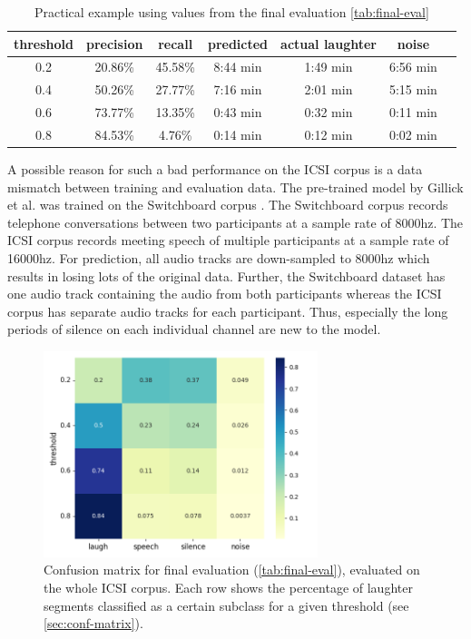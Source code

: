 \documentclass[bsc,frontabs,parskip,deptreport]{infthesis}
\newcommand{\confmatrixcaption}{Each row shows the percentage of laughter segments classified as a certain subclass for a given threshold (see \autoref{sec:conf-matrix}). }
\begin{document}
\begin{table}[]
    \centering
    \begin{tabular}{|c|c|c|c|c|c|c|}
      \hline
      threshold & precision & recall & predicted & actual laughter & noise \\
      \hline
      0.2 &  20.86\% & 45.58\% & 8:44 min & 1:49 min & 6:56 min \\
      0.4 &  50.26\% & 27.77\% & 7:16 min & 2:01 min & 5:15 min \\
      0.6 &  73.77\% & 13.35\% & 0:43 min & 0:32 min & 0:11 min \\
      0.8 &  84.53\% & 4.76\% & 0:14 min & 0:12 min & 0:02 min \\
      \hline
    \end{tabular}
    \caption{Practical example using values from the final evaluation \autoref{tab:final-eval}}
    \label{tab:practical-example}
\end{table}


A possible reason for such a bad performance on the ICSI corpus is a data mismatch between training and evaluation data. The pre-trained model by Gillick et al. \citep{gillick2021robust} was trained on the Switchboard corpus \citep{switchboard-corpus}. The Switchboard corpus records telephone conversations between two participants at a sample rate of 8000hz. The ICSI corpus records meeting speech of multiple participants at a sample rate of 16000hz. For prediction, all audio tracks are down-sampled to 8000hz which results in losing lots of the original data. 
Further, the Switchboard dataset has one audio track containing the audio from both participants whereas the ICSI corpus has separate audio tracks for each participant. Thus, especially the long periods of silence on each individual channel are new to the model. 

\begin{figure}[h!]
    \centering
    \includegraphics[width=8cm]{imgs/conf_matrix/init_eval_all.png}
    \caption{Confusion matrix for final evaluation (\autoref{tab:final-eval}), evaluated on the whole ICSI corpus. \confmatrixcaption}
    \label{fig:initial-conf-matrix}
\end{figure}
\end{document}
